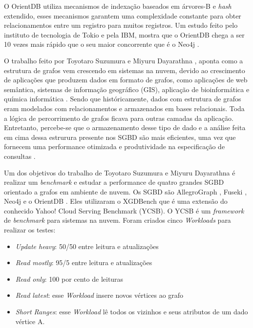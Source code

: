 	O OrientDB utiliza mecanismos de indexação baseados em árvores-B e \textit{hash} extendido, esses mecanismos garantem uma complexidade constante para obter relacionamentos entre um registro para muitos registros. Um estudo feito pelo instituto de tecnologia de Tokio e pela IBM, mostra que o OrientDB chega a ser 10 vezes mais rápido que o seu maior concorrente que é o Neo4j \cite{dayarathna2012xgdbench}.
	
	O trabalho feito por Toyotaro Suzumura e Miyuru Dayarathna \cite{dayarathna2012xgdbench}, aponta como a estrutura de grafos vem crescendo em sistemas na nuvem, devido ao crescimento de aplicações que produzem dados em formato de grafos, como aplicações de web semântica, sistemas de informação geográfico (GIS), aplicação de bioinformática \cite{dudley2010translational} e química informática \cite{ekins2010chemical}. Sendo que históricamente, dados com estrutura de grafos eram modelados com relacionamentos e armazenados em bases relacionais. Toda a lógica de percorrimento de grafos ficava para outras camadas da aplicação. Entretanto, percebe-se que o armazenamento desse tipo de dado e a análise feita em cima dessa estrurura presente nos SGBD são mais eficientes, uma vez que fornecem uma performance otimizada e produtividade na especificação de consultas \cite{dayarathna2012xgdbench}.
	
	Um dos objetivos do trabalho de Toyotaro Suzumura e Miyuru Dayarathna \cite{dayarathna2012xgdbench} é realizar um \textit{benchmark} e estudar a performance de quatro grandes SGBD orientado a grafos em ambiente de nuvem. Os SGBD são AllegroGraph \cite{allegro}, Fuseki \cite{fuseki}, Neo4j \cite{neo4j-site} e o OrientDB \cite{orientdb-site}. Eles utilizaram o XGDBench que é uma extensão do conhecido Yahoo! Cloud Serving Benchmark (YCSB). O YCSB é um \textit{framework} de \textit{benchmark} para sistemas na nuvem. Foram criados cinco \textit{Workloads} para realizar os testes:

\begin{itemize}
	\item  \textit{Update heavy}: 50/50 entre leitura e atualizações
	\item  \textit{Read mostly}: 95/5 entre leitura e atualizações
	\item  \textit{Read only}: 100 por cento de leituras
	\item  \textit{Read latest}: esse \textit{Workload} insere novos vértices ao grafo
	\item  \textit{Short Ranges}: esse \textit{Workload} lê todos os vizinhos e seus atributos de um dado vértice A.
\end{itemize}

